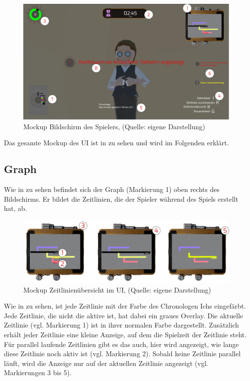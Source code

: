 \begin{figure}[ht]
\centering
\includegraphics[width=1\linewidth]{content/pictures/UI.jpg}
\caption{Mockup Bildschirm des Spielers, (Quelle: eigene Darstellung)}
\label{fig:ui-player}
\end{figure}

Das gesamte Mockup des \ac{UI} ist in  zu sehen und wird im Folgenden erklärt.

\subsection{Graph}\label{sec:graph_ui}
Wie in  zu sehen befindet sich der Graph (Markierung 1) oben rechts des Bildschirms. Er bildet die Zeitlinien, die der Spieler während des Spiels erstellt hat, ab. 

\begin{figure}[ht]
\centering
\includegraphics[width=1\linewidth]{content/pictures/Graph.jpg}
\caption{Mockup Zeitlinienübersicht im UI, (Quelle: eigene Darstellung)}
\label{fig:ui_graph-player}
\end{figure}

Wie in  zu sehen, ist jede Zeitlinie mit der Farbe des Chronologen Ichs eingefärbt. Jede Zeitlinie, die nicht die aktive ist, hat dabei ein graues Overlay. Die aktuelle Zeitlinie (vgl. Markierung 1) ist in ihrer normalen Farbe dargestellt. Zusätzlich erhält jeder Zeitlinie eine kleine Anzeige, auf dem die Spielzeit der Zeitlinie steht. Für parallel laufende Zeitlinien gibt es das auch, hier wird angezeigt, wie lange diese Zeitlinie noch aktiv ist (vgl. Markierung 2). Sobald keine Zeitlinie parallel läuft, wird die Anzeige nur auf der aktuellen Zeitlinie angezeigt (vgl. Markierungen 3 bis 5).

